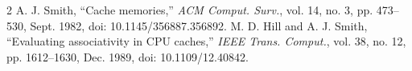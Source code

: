 \begin{thebibliography}{2}
A. J. Smith, \textquotedblleft{}Cache memories,'' \emph{ACM Comput. Surv.},
vol. 14, no. 3, pp. 473--530, Sept. 1982, doi: 10.1145/356887.356892.
M. D. Hill and A. J. Smith, \textquotedblleft{}Evaluating associativity in CPU caches,''
\emph{IEEE Trans. Comput.}, vol. 38, no. 12, pp. 1612--1630, Dec. 1989,
doi: 10.1109/12.40842.
\end{thebibliography}

